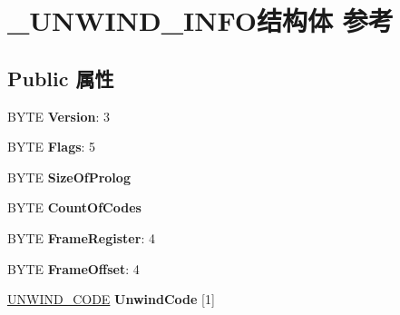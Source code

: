 \hypertarget{struct___u_n_w_i_n_d___i_n_f_o}{}\section{\+\_\+\+U\+N\+W\+I\+N\+D\+\_\+\+I\+N\+F\+O结构体 参考}
\label{struct___u_n_w_i_n_d___i_n_f_o}
\subsection*{Public 属性}
\begin{DoxyCompactItemize}
\item 
\mbox{\label{struct___u_n_w_i_n_d___i_n_f_o_a7b3c07c23bbce04a602daf6a5cfe7fc3}} 
B\+Y\+TE {\bfseries Version}\+: 3
\item 
\mbox{\label{struct___u_n_w_i_n_d___i_n_f_o_ae1addf0d2eb5fca6a5ff29eea960144b}} 
B\+Y\+TE {\bfseries Flags}\+: 5
\item 
\mbox{\label{struct___u_n_w_i_n_d___i_n_f_o_ab03b6de594514f833af3669dbff34fdc}} 
B\+Y\+TE {\bfseries Size\+Of\+Prolog}
\item 
\mbox{\label{struct___u_n_w_i_n_d___i_n_f_o_a38288c11c95873f281a741979d636b87}} 
B\+Y\+TE {\bfseries Count\+Of\+Codes}
\item 
\mbox{\label{struct___u_n_w_i_n_d___i_n_f_o_a4231b97ed2c03648960d413835ac86e5}} 
B\+Y\+TE {\bfseries Frame\+Register}\+: 4
\item 
\mbox{\label{struct___u_n_w_i_n_d___i_n_f_o_ae022c245096de723ddce2960d8be6bed}} 
B\+Y\+TE {\bfseries Frame\+Offset}\+: 4
\item 
\mbox{\label{struct___u_n_w_i_n_d___i_n_f_o_accc95e13a0f39c868ab0cb02d4f36743}} 
\hyperlink{union___u_n_w_i_n_d___c_o_d_e}{U\+N\+W\+I\+N\+D\+\_\+\+C\+O\+DE} {\bfseries Unwind\+Code} \mbox{[}1\mbox{]}
\item 
\mbox{\label{struct___u_n_w_i_n_d___i_n_f_o_ad8223abc71fa95264829a5eff9ada19f}} 

\end{DoxyCompactItemize}
